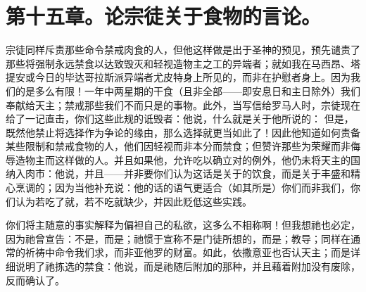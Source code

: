 
\section{第十五章。论宗徒关于食物的言论。}

宗徒同样斥责那些命令禁戒肉食的人，但他这样做是出于圣神的预见，预先谴责了那些将强制永远禁食以达致毁灭和轻视造物主之工的异端者；就如我在马西昂、塔提安或今日的毕达哥拉斯派异端者尤皮特身上所见的，而非在护慰者身上。因为我们的是多么有限！一年中两星期的干食（且非全部——即安息日和主日除外）我们奉献给天主；禁戒那些我们不而只是的事物。此外，当写信给罗马人时，宗徒现在给了一记直击，你们这些此规的诋毁者：他说，什么就是关于他所说的：   但是，既然他禁止将选择作为争论的缘由，那么选择就更当如此了！因此他知道如何责备某些限制和禁戒食物的人，他们因轻视而非本分而禁食；但赞许那些为荣耀而非侮辱造物主而这样做的人。并且如果他，允许吃以确立对的例外，他仍未将天主的国纳入肉市：他说，并且——并非要你们认为这话是关于的饮食，而是关于丰盛和精心烹调的；因为当他补充说：他的话的语气更适合（如其所是）你们而非我们，你们认为若吃了就，若不吃就缺少，并因此贬低这些实践。\par

你们将主随意的事实解释为偏袒自己的私欲，这多么不相称啊！但我想祂也必定，因为祂曾宣告：不是，而是；祂惯于宣称不是门徒所想的，而是；教导；同样在通常的祈祷中命令我们求，而非亚他罗的财富。如此，依撒意亚也否认天主；而是详细说明了祂拣选的禁食：他说，而是祂随后附加的那种，并且藉着附加没有废除，反而确认了。\par

